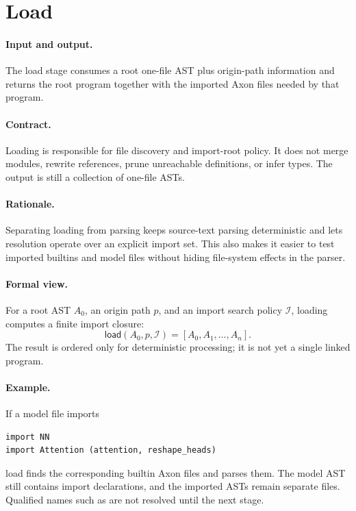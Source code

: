 \section{Load}

\paragraph{Input and output.}
The load stage consumes a root one-file AST plus origin-path information and
returns the root program together with the imported Axon files needed by that
program.

\paragraph{Contract.}
Loading is responsible for file discovery and import-root policy.  It does not
merge modules, rewrite references, prune unreachable definitions, or infer
types.  The output is still a collection of one-file ASTs.

\paragraph{Rationale.}
Separating loading from parsing keeps source-text parsing deterministic and
lets resolution operate over an explicit import set.  This also makes it easier
to test imported builtins and model files without hiding file-system effects in
the parser.

\paragraph{Formal view.}
For a root AST \(A_0\), an origin path \(p\), and an import search policy
\(\mathcal{I}\), loading computes a finite import closure:
\[
  \mathsf{load}(A_0,p,\mathcal{I}) = [A_0,A_1,\ldots,A_n].
\]
The result is ordered only for deterministic processing; it is not yet a
single linked program.

\paragraph{Example.}
If a model file imports
\begin{verbatim}
import NN
import Attention (attention, reshape_heads)
\end{verbatim}
load finds the corresponding builtin Axon files and parses them.  The model AST
still contains import declarations, and the imported ASTs remain separate
files.  Qualified names such as  are not resolved
until the next stage.
